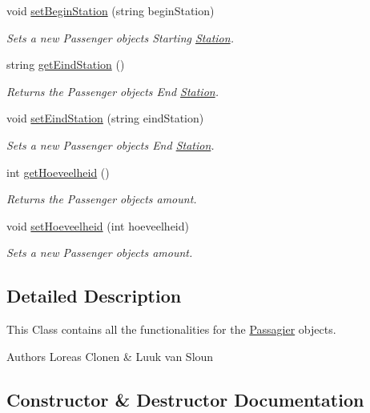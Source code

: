 \begin{DoxyCompactItemize}
void \hyperlink{classPassagier_afc4826ff4dacbbe15f15f6e8ef338ff0}{set\+Begin\+Station} (string begin\+Station)
\begin{DoxyCompactList}\small\item\em Sets a new Passenger object\textquotesingle{}s Starting \hyperlink{classStation}{Station}. \end{DoxyCompactList}\item 
string \hyperlink{classPassagier_a721949463e02e122567c9967786a8a38}{get\+Eind\+Station} ()
\begin{DoxyCompactList}\small\item\em Returns the Passenger object\textquotesingle{}s End \hyperlink{classStation}{Station}. \end{DoxyCompactList}\item 
void \hyperlink{classPassagier_a93606f0982849fc1838b5e16ab5f1b12}{set\+Eind\+Station} (string eind\+Station)
\begin{DoxyCompactList}\small\item\em Sets a new Passenger object\textquotesingle{}s End \hyperlink{classStation}{Station}. \end{DoxyCompactList}\item 
int \hyperlink{classPassagier_a1fd825eaa3db5b68cc24ca297e45d198}{get\+Hoeveelheid} ()
\begin{DoxyCompactList}\small\item\em Returns the Passenger object\textquotesingle{}s amount. \end{DoxyCompactList}\item 
void \hyperlink{classPassagier_adf498b0e24ef821f30e479591da7a3d3}{set\+Hoeveelheid} (int hoeveelheid)
\begin{DoxyCompactList}\small\item\em Sets a new Passenger object\textquotesingle{}s amount. \end{DoxyCompactList}\end{DoxyCompactItemize}


\subsection{Detailed Description}
This Class contains all the functionalities for the \hyperlink{classPassagier}{Passagier} objects. 

\begin{DoxyAuthor}{Authors}
Loreas Clonen \& Luuk van Sloun 
\end{DoxyAuthor}


\subsection{Constructor \& Destructor Documentation}
